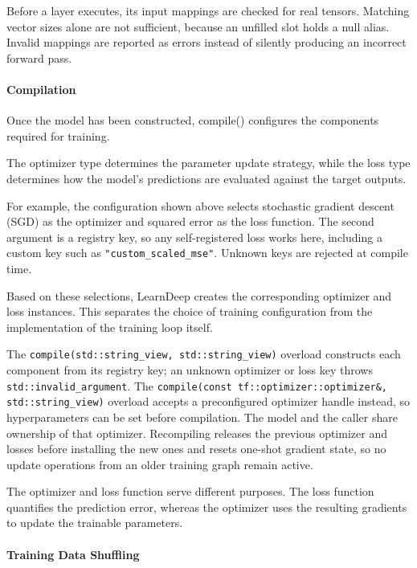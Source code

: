 Before a layer executes, its input mappings are checked for
real tensors. Matching vector sizes alone are not sufficient,
because an unfilled slot holds a null alias. Invalid mappings
are reported as errors instead of silently producing an
incorrect forward pass.

\paragraph{Compilation}

Once the model has been constructed, compile() configures
the components required for training.

The optimizer type determines the parameter update strategy,
while the loss type determines how the model's predictions
are evaluated against the target outputs.

For example, the configuration shown above selects
stochastic gradient descent (SGD) as the optimizer and
squared error as the loss function. The second argument is a registry key,
so any self-registered loss works here, including a custom key such as
\texttt{"custom\_scaled\_mse"}. Unknown keys are rejected at compile time.

Based on these selections, LearnDeep creates the corresponding
optimizer and loss instances. This separates the choice of
training configuration from the implementation of the
training loop itself.

The \texttt{compile(std::string\_view, std::string\_view)} overload constructs
each component from its registry key; an unknown optimizer or loss key throws
\texttt{std::invalid\_argument}. The
\texttt{compile(const tf::optimizer::optimizer\&, std::string\_view)} overload
accepts a preconfigured optimizer handle instead, so hyperparameters can be set
before compilation. The model and the caller share ownership of that optimizer.
Recompiling releases the previous optimizer and losses before installing the new
ones and resets one-shot gradient state, so no update operations from an older
training graph remain active.

The optimizer and loss function serve different purposes.
The loss function quantifies the prediction error, whereas
the optimizer uses the resulting gradients to update the
trainable parameters.

\paragraph{Training Data Shuffling}

